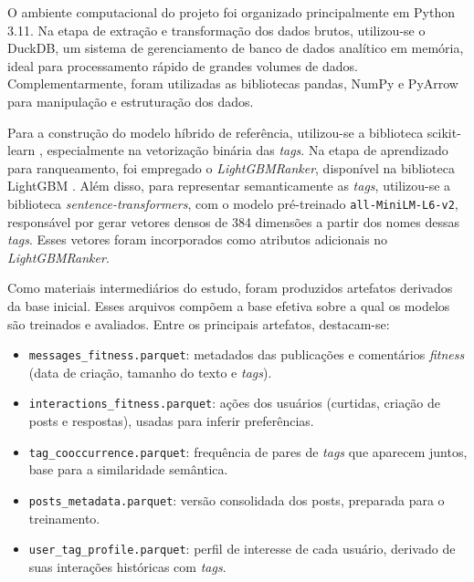 \documentclass[a4paper,12pt]{article}
\begin{document}
O ambiente computacional do projeto foi organizado principalmente em Python 3.11. Na etapa de extração e transformação dos dados brutos, utilizou-se o DuckDB, um sistema de gerenciamento de banco de dados analítico em memória, ideal para processamento rápido de grandes volumes de dados. Complementarmente, foram utilizadas as bibliotecas pandas, NumPy e PyArrow para manipulação e estruturação dos dados.

Para a construção do modelo híbrido de referência, utilizou-se a biblioteca scikit-learn \cite{pedregosa2011scikit}, especialmente na vetorização binária das \textit{tags}. Na etapa de aprendizado para ranqueamento, foi empregado o \textit{LightGBMRanker}, disponível na biblioteca LightGBM \cite{Ke2017LightGBM}. Além disso, para representar semanticamente as \textit{tags}, utilizou-se a biblioteca \textit{sentence-transformers}, com o modelo pré-treinado \texttt{all-MiniLM-L6-v2}, responsável por gerar vetores densos de 384 dimensões a partir dos nomes dessas \textit{tags}. Esses vetores foram incorporados como atributos adicionais no \textit{LightGBMRanker}.


Como materiais intermediários do estudo, foram produzidos artefatos derivados da base inicial. Esses arquivos compõem a base efetiva sobre a qual os modelos são treinados e avaliados. Entre os principais artefatos, destacam-se:

\begin{itemize}
    \item[a)] \texttt{messages\_fitness.parquet}: metadados das publicações e comentários \textit{fitness} (data de criação, tamanho do texto e \textit{tags}).
    \item[b)] \texttt{interactions\_fitness.parquet}: ações dos usuários (curtidas, criação de posts e respostas), usadas para inferir preferências.
    \item[c)] \texttt{tag\_cooccurrence.parquet}: frequência de pares de \textit{tags} que aparecem juntos, base para a similaridade semântica.
    \item[d)] \texttt{posts\_metadata.parquet}: versão consolidada dos posts, preparada para o treinamento.
    \item[e)] \texttt{user\_tag\_profile.parquet}: perfil de interesse de cada usuário, derivado de suas interações históricas com \textit{tags}.
\end{itemize}
\end{document}

